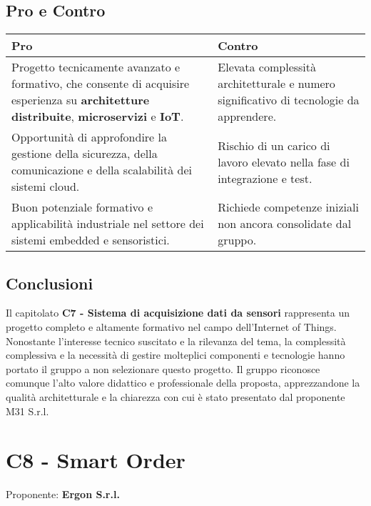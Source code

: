\documentclass[a4paper,12pt]{article}
\begin{document}
{{{    \subsection{Pro e Contro}
        \begin{center}
            \begin{tabular}{|p{9cm}|p{5cm}|}
                \hline
                \textbf{Pro} & \textbf{Contro} \\
                \hline
                Progetto tecnicamente avanzato e formativo, che consente di acquisire esperienza su \textbf{architetture distribuite}, \textbf{microservizi} e \textbf{IoT}. & Elevata complessità architetturale e numero significativo di tecnologie da apprendere. \\
                \hline
                Opportunità di approfondire la gestione della sicurezza, della comunicazione e della scalabilità dei sistemi cloud. & Rischio di un carico di lavoro elevato nella fase di integrazione e test. \\
                \hline
                Buon potenziale formativo e applicabilità industriale nel settore dei sistemi embedded e sensoristici. & Richiede competenze iniziali non ancora consolidate dal gruppo. \\
                \hline
            \end{tabular}
        \end{center}
    

    \subsection{Conclusioni}
        Il capitolato \textbf{C7 - Sistema di acquisizione dati da sensori} rappresenta un progetto completo e altamente formativo nel campo dell’Internet of Things.
        Nonostante l’interesse tecnico suscitato e la rilevanza del tema, la complessità complessiva e la necessità di gestire molteplici componenti e tecnologie hanno portato il gruppo a non selezionare questo progetto.
        Il gruppo riconosce comunque l’alto valore didattico e professionale della proposta, apprezzandone la qualità architetturale e la chiarezza con cui è stato presentato dal proponente M31 S.r.l.
    



\newpage

\section{C8 - Smart Order}
    Proponente: \textbf{Ergon S.r.l.}

}}}
\end{document}
